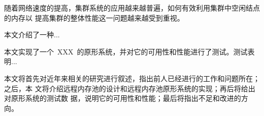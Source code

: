 \begin{cabstract}

随着网络速度的提高，集群系统的应用越来越普遍，如何有效利用集群中空闲结点的内存以
提高集群的整体性能这一问题越来越受到重视。

本文介绍了一种...

本文实现了一个~XXX~的原形系统，并对它的可用性和性能进行了测试。测试表明...

本文将首先对近年来相关的研究进行叙述，指出前人已经进行的工作和问题所在；之后，本
文将介绍远程内存池的设计和远程内存池原形系统的实现；再后将给出对原形系统的测试数
据，说明它的可用性和性能；最后将指出不足和改进的方向。

\end{cabstract}
